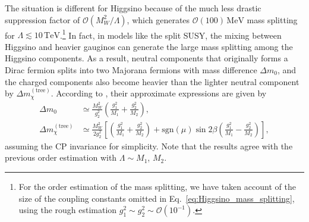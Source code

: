 \documentclass[12pt,twoside,book]{article}
\begin{document}
The situation is different for Higgsino because of the much less drastic suppression factor of $\mathcal{O} (M_W^2 / \Lambda)$, which generates $\mathcal{O} (100)\,\mathrm{MeV}$ mass splitting for $\Lambda \lesssim \mathrm{10}\,\mathrm{TeV}$.\footnote
{
  For the order estimation of the mass splitting, we have taken account of the size of the coupling constants omitted in Eq.~\eqref{eq:Higgsino_mass_splitting}, using the rough estimation $g_1^2 \sim g_2^2 \sim \mathcal{O} (10^{-1})$.
}
In fact, in models like the split SUSY, the mixing between Higgsino and heavier gauginos can generate the large mass splitting among the Higgsino components.
As a result, neutral components that originally forms a Dirac fermion splits into two Majorana fermions with mass difference $\Delta m_0$, and the charged components also become heavier than the lighter neutral component by $\Delta m_\chi^{\mathrm{(tree)}}$.
According to \cite{Fukuda:2017jmk}, their approximate expressions are given by
\begin{align}
  \Delta m_0 &\simeq \frac{M_W^2}{g_2^2} \left( \frac{g_1^2}{M_1} + \frac{g_2^2}{M_2} \right),\\
  \Delta m_\chi^{\mathrm{(tree)}} &\simeq \frac{M_W^2}{2 g_2^2} \left[
  \left( \frac{g_1^2}{M_1} + \frac{g_2^2}{M_2} \right)
  + \mathrm{sgn} (\mu) \sin 2\beta \left( \frac{g_1^2}{M_1} - \frac{g_2^2}{M_2} \right) \right],
  \label{eq:Higgsino_delm_tree}
\end{align}
assuming the CP invariance for simplicity.
Note that the results agree with the previous order estimation with $\Lambda \sim M_1$, $M_2$.
\end{document}
